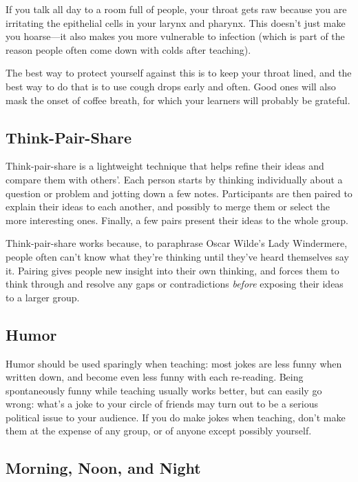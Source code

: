 If you talk all day to a room full of people, your throat gets raw
because you are irritating the epithelial cells in your larynx and
pharynx. This doesn't just make you hoarse---it also makes you more
vulnerable to infection (which is part of the reason people often come
down with colds after teaching).

The best way to protect yourself against this is to keep your throat
lined, and the best way to do that is to use cough drops early and
often. Good ones will also mask the onset of coffee breath, for which
your learners will probably be grateful.

\subsection*{Think-Pair-Share}

Think-pair-share is a lightweight technique that helps refine their
ideas and compare them with others'. Each person starts by thinking
individually about a question or problem and jotting down a few notes.
Participants are then paired to explain their ideas to each another, and
possibly to merge them or select the more interesting ones. Finally, a
few pairs present their ideas to the whole group.

Think-pair-share works because, to paraphrase Oscar Wilde's Lady
Windermere, people often can't know what they're thinking until
they've heard themselves say it. Pairing gives people new insight into
their own thinking, and forces them to think through and resolve any
gaps or contradictions \emph{before} exposing their ideas to a larger
group.

\subsection*{Humor}

Humor should be used sparingly when teaching: most jokes are less
funny when written down, and become even less funny with each
re-reading.  Being spontaneously funny while teaching usually works
better, but can easily go wrong: what's a joke to your circle of
friends may turn out to be a serious political issue to your
audience. If you do make jokes when teaching, don't make them at the
expense of any group, or of anyone except possibly yourself.

\subsection*{Morning, Noon, and Night}

